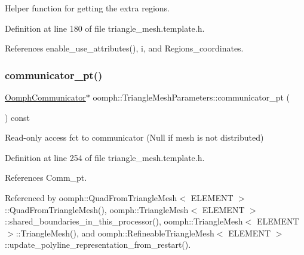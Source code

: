 Helper function for getting the extra regions. 



Definition at line 180 of file triangle\+\_\+mesh.\+template.\+h.



References enable\+\_\+use\+\_\+attributes(), i, and Regions\+\_\+coordinates.

\mbox{\label{classoomph_1_1TriangleMeshParameters_a53f1dd35a25718f86d73a1dc3458644d}} 
\subsubsection{\texorpdfstring{communicator\+\_\+pt()}{communicator\_pt()}}
{\footnotesize\ttfamily \hyperlink{classoomph_1_1OomphCommunicator}{Oomph\+Communicator}$\ast$ oomph\+::\+Triangle\+Mesh\+Parameters\+::communicator\+\_\+pt (\begin{DoxyParamCaption}{ }\end{DoxyParamCaption}) const\hspace{0.3cm}{\ttfamily [inline]}}



Read-\/only access fct to communicator (Null if mesh is not distributed) 



Definition at line 254 of file triangle\+\_\+mesh.\+template.\+h.



References Comm\+\_\+pt.



Referenced by oomph\+::\+Quad\+From\+Triangle\+Mesh$<$ E\+L\+E\+M\+E\+N\+T $>$\+::\+Quad\+From\+Triangle\+Mesh(), oomph\+::\+Triangle\+Mesh$<$ E\+L\+E\+M\+E\+N\+T $>$\+::shared\+\_\+boundaries\+\_\+in\+\_\+this\+\_\+processor(), oomph\+::\+Triangle\+Mesh$<$ E\+L\+E\+M\+E\+N\+T $>$\+::\+Triangle\+Mesh(), and oomph\+::\+Refineable\+Triangle\+Mesh$<$ E\+L\+E\+M\+E\+N\+T $>$\+::update\+\_\+polyline\+\_\+representation\+\_\+from\+\_\+restart().

\mbox{\label{classoomph_1_1TriangleMeshParameters_a5b233318ec4e4635d7b74c27d0c6287c}} 
